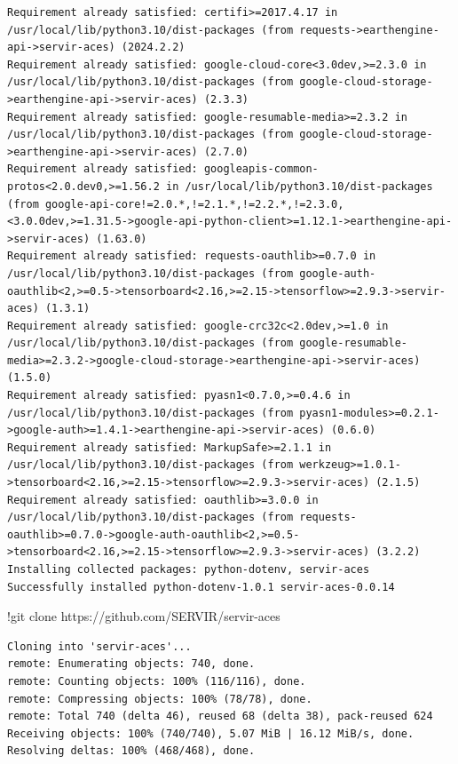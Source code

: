 \documentclass[
  letterpaper,
  DIV=11,
  numbers=noendperiod]{scrreprt}
\newenvironment{Shaded}{\begin{snugshade}}{\end{snugshade}}
\newcommand{\NormalTok}[1]{\textcolor[rgb]{0.00,0.23,0.31}{#1}}
\newcommand{\OperatorTok}[1]{\textcolor[rgb]{0.37,0.37,0.37}{#1}}
\begin{document}
\begin{verbatim}
Requirement already satisfied: certifi>=2017.4.17 in /usr/local/lib/python3.10/dist-packages (from requests->earthengine-api->servir-aces) (2024.2.2)
Requirement already satisfied: google-cloud-core<3.0dev,>=2.3.0 in /usr/local/lib/python3.10/dist-packages (from google-cloud-storage->earthengine-api->servir-aces) (2.3.3)
Requirement already satisfied: google-resumable-media>=2.3.2 in /usr/local/lib/python3.10/dist-packages (from google-cloud-storage->earthengine-api->servir-aces) (2.7.0)
Requirement already satisfied: googleapis-common-protos<2.0.dev0,>=1.56.2 in /usr/local/lib/python3.10/dist-packages (from google-api-core!=2.0.*,!=2.1.*,!=2.2.*,!=2.3.0,<3.0.0dev,>=1.31.5->google-api-python-client>=1.12.1->earthengine-api->servir-aces) (1.63.0)
Requirement already satisfied: requests-oauthlib>=0.7.0 in /usr/local/lib/python3.10/dist-packages (from google-auth-oauthlib<2,>=0.5->tensorboard<2.16,>=2.15->tensorflow>=2.9.3->servir-aces) (1.3.1)
Requirement already satisfied: google-crc32c<2.0dev,>=1.0 in /usr/local/lib/python3.10/dist-packages (from google-resumable-media>=2.3.2->google-cloud-storage->earthengine-api->servir-aces) (1.5.0)
Requirement already satisfied: pyasn1<0.7.0,>=0.4.6 in /usr/local/lib/python3.10/dist-packages (from pyasn1-modules>=0.2.1->google-auth>=1.4.1->earthengine-api->servir-aces) (0.6.0)
Requirement already satisfied: MarkupSafe>=2.1.1 in /usr/local/lib/python3.10/dist-packages (from werkzeug>=1.0.1->tensorboard<2.16,>=2.15->tensorflow>=2.9.3->servir-aces) (2.1.5)
Requirement already satisfied: oauthlib>=3.0.0 in /usr/local/lib/python3.10/dist-packages (from requests-oauthlib>=0.7.0->google-auth-oauthlib<2,>=0.5->tensorboard<2.16,>=2.15->tensorflow>=2.9.3->servir-aces) (3.2.2)
Installing collected packages: python-dotenv, servir-aces
Successfully installed python-dotenv-1.0.1 servir-aces-0.0.14
\end{verbatim}

\begin{Shaded}
\begin{Highlighting}[]
\OperatorTok{!}\NormalTok{git clone https:}\OperatorTok{//}\NormalTok{github.com}\OperatorTok{/}\NormalTok{SERVIR}\OperatorTok{/}\NormalTok{servir}\OperatorTok{{-}}\NormalTok{aces}
\end{Highlighting}
\end{Shaded}

\begin{verbatim}
Cloning into 'servir-aces'...
remote: Enumerating objects: 740, done.
remote: Counting objects: 100% (116/116), done.
remote: Compressing objects: 100% (78/78), done.
remote: Total 740 (delta 46), reused 68 (delta 38), pack-reused 624
Receiving objects: 100% (740/740), 5.07 MiB | 16.12 MiB/s, done.
Resolving deltas: 100% (468/468), done.
\end{verbatim}
\end{document}
